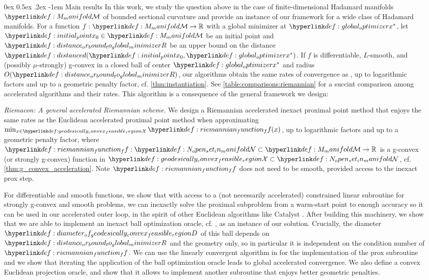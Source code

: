 \documentclass[12pt]{alt2021}
\makeatletter
\renewcommand*\R{\mathbb{R}}
\renewcommand\paragraph{\@startsection{paragraph}{4}{\z@}%
                                    {0ex \@plus0.5ex \@minus.2ex}%
                                    {-1em}%
                                    {\normalfont\normalsize\bfseries}}
\newcommand{\bigo}[1]{O( #1 )}
\makeatother
\begin{document}
\paragraph{Main results} In this work, we study the question above in the case of finite-dimensional Hadamard manifolds $\M$ of bounded sectional curvature and provide an instance of our framework for a wide class of Hadamard manifolds. For a function $f:\M\to\R$ with a global minimizer at $\xastg$, let $\xInit \in \M$ be an initial point and $\RR$ be an upper bound on the distance $\dist(\xInit, \xastg)$. If $f$ is differentiable, $L$-smooth, and (possibly $\mu$-strongly) g-convex in a closed ball of center $\xastg$ and radius $\bigo{\RR}$, our algorithms obtain the same rates of convergence as \AGD{}, up to logarithmic factors and up to a geometric penalty factor, cf. \cref{thm:instantiation}. See \cref{table:comparisons:riemannian} for a succint comparison among accelerated algorithms and their rates. This algorithm is a consequence of the general framework we design:

\emph{Riemacon: A general accelerated Riemannian scheme.} We design a Riemannian accelerated inexact proximal point method that enjoys the same rates as the Euclidean accelerated proximal point method when approximating $\min_{x\in\X}\f(x)$, up to logarithmic factors and up to a geometric penalty factor, where $\f :\NN \subset \M  \to \R$ is a  g-convex (or strongly g-convex) function in $\X \subset\NN$, cf. \cref{thm:g_convex_acceleration}. Note $\f$ does not need to be smooth, provided access to the inexact prox step.

For differentiable and smooth functions, we show that with access to a (not necessarily accelerated) constrained linear subroutine for strongly g-convex and smooth problems, we can inexactly solve the proximal subproblem from a warm-start point to enough accuracy so it can be used in our accelerated outer loop, in the spirit of other Euclidean algorithms like Catalyst \citep{lin2017catalyst}. After building this machinery, we show that we are able to implement an inexact ball optimization oracle, cf. \citep{carmon2020acceleration}, as an instance of our solution. Crucially, the diameter $\D$ of this ball depends on $\RR$ and the geometry only, so in particular it is independent on the condition number of $\f$. We can use the linearly convergent algorithm in \citep{criscitiello2022negative} for the implementation of the prox subroutine and we show that iterating the application of the ball optimization oracle leads to global accelerated convergence. We also define a convex Euclidean projection oracle, and show that it allows to implement another subroutine that enjoys better geometric penalties.
\end{document}
